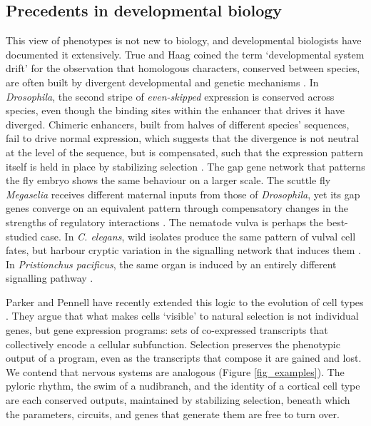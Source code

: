 \documentclass[twocolumn]{article}
\begin{document}
\subsection{Precedents in developmental biology}

This view of phenotypes is not new to biology, and developmental biologists have documented it extensively. True and Haag coined the term `developmental system drift' for the observation that homologous characters, conserved between species, are often built by divergent developmental and genetic mechanisms \cite{True_Haag_2001, McColgan_DiFrisco_2024}. In \textit{Drosophila}, the second stripe of \textit{even-skipped} expression is conserved across species, even though the binding sites within the enhancer that drives it have diverged. Chimeric enhancers, built from halves of different species' sequences, fail to drive normal expression, which suggests that the divergence is not neutral at the level of the sequence, but is compensated, such that the expression pattern itself is held in place by stabilizing selection \cite{Ludwig_Bergman_2000}. The gap gene network that patterns the fly embryo shows the same behaviour on a larger scale. The scuttle fly \textit{Megaselia} receives different maternal inputs from those of \textit{Drosophila}, yet its gap genes converge on an equivalent pattern through compensatory changes in the strengths of regulatory interactions \cite{Wotton_JimenezGuri_2015, Crombach_Wotton_2016}. The nematode vulva is perhaps the best-studied case. In \textit{C. elegans}, wild isolates produce the same pattern of vulval cell fates, but harbour cryptic variation in the signalling network that induces them \cite{Milloz_Duveau_2008, Felix_Wagner_2008}. In \textit{Pristionchus pacificus}, the same organ is induced by an entirely different signalling pathway \cite{Tian_Schlager_2008}.

Parker and Pennell have recently extended this logic to the evolution of cell types \cite{Parker_Pennell_2025}. They argue that what makes cells `visible' to natural selection is not individual genes, but gene expression programs: sets of co-expressed transcripts that collectively encode a cellular subfunction. Selection preserves the phenotypic output of a program, even as the transcripts that compose it are gained and lost. We contend that nervous systems are analogous (Figure \ref{fig_examples}). The pyloric rhythm, the swim of a nudibranch, and the identity of a cortical cell type are each conserved outputs, maintained by stabilizing selection, beneath which the parameters, circuits, and genes that generate them are free to turn over.
\end{document}
